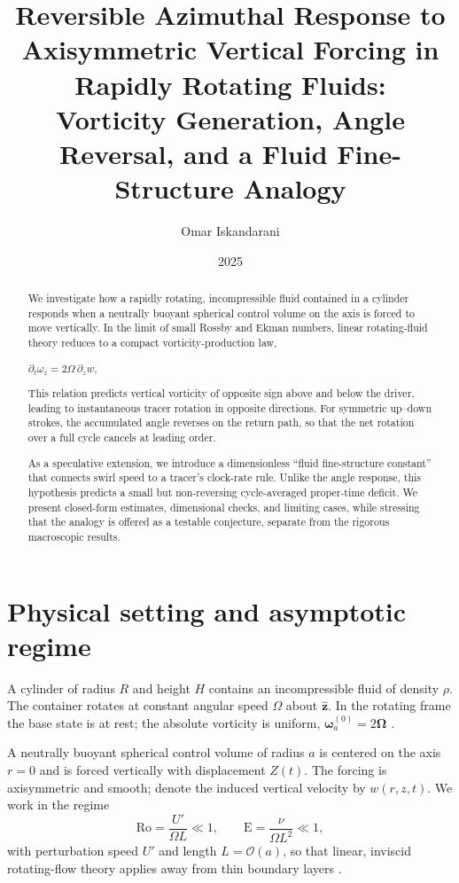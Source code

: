 \documentclass[12pt]{article}
\title{Reversible Azimuthal Response to Axisymmetric Vertical Forcing in Rapidly Rotating Fluids:\\
Vorticity Generation, Angle Reversal, and a Fluid Fine-Structure Analogy}
\author{Omar Iskandarani}
\date{2025}
\newcommand{\bW}{\boldsymbol{\omega}}
\newcommand{\bOm}{\boldsymbol{\Omega}}
\newcommand{\ez}{\hat{\boldsymbol{z}}}
\newcommand{\p}{\partial}
\begin{document}
    \maketitle

    \begin{abstract}

We investigate how a rapidly rotating, incompressible fluid contained in a cylinder responds when a neutrally buoyant spherical control volume on the axis is forced to move vertically. In the limit of small Rossby and Ekman numbers, linear rotating-fluid theory reduces to a compact vorticity-production law,

        \(
        \p_t \omega_z = 2\Omega\,\p_z w
        \),

This relation predicts vertical vorticity of opposite sign above and below the driver, leading to instantaneous tracer rotation in opposite directions. For symmetric up–down strokes, the accumulated angle reverses on the return path, so that the net rotation over a full cycle cancels at leading order.


As a speculative extension, we introduce a dimensionless “fluid fine-structure constant” that connects swirl speed to a tracer’s clock-rate rule. Unlike the angle response, this hypothesis predicts a small but non-reversing cycle-averaged proper-time deficit. We present closed-form estimates, dimensional checks, and limiting cases, while stressing that the analogy is offered as a testable conjecture, separate from the rigorous macroscopic results.



    \end{abstract}


    \section{Physical setting and asymptotic regime}
    A cylinder of radius \(R\) and height \(H\) contains an incompressible fluid of density \(\rho\). The container rotates at constant angular speed \(\Omega\) about \(\ez\). In the rotating frame the base state is at rest; the absolute vorticity is uniform, \(\bW_a^{(0)}=2\bOm\) \cite{Batchelor1967,Greenspan1968}.

    A neutrally buoyant spherical control volume of radius \(a\) is centered on the axis \(r=0\) and is forced vertically with displacement \(Z(t)\). The forcing is axisymmetric and smooth; denote the induced vertical velocity by \(w(r,z,t)\). We work in the regime
    \[
        \mathrm{Ro}=\frac{U'}{\Omega L}\ll1,\qquad
        \mathrm{E}=\frac{\nu}{\Omega L^2}\ll1,
    \]
    with perturbation speed \(U'\) and length \(L=\mathcal{O}(a)\), so that linear, inviscid rotating-flow theory applies away from thin boundary layers \cite{Batchelor1967,Greenspan1968,Vallis2017}.
\end{document}
